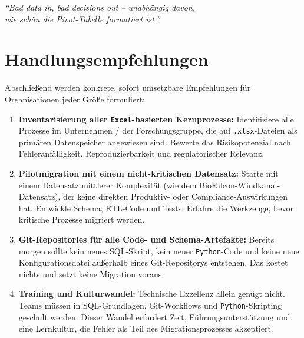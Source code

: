 \documentclass[12pt,a4paper]{report}
\theoremstyle{definition}
\theoremstyle{remark}
\newcommand{\excel}{\texttt{Excel}}
\newcommand{\py}{\texttt{Python}}
\newcommand{\code}[1]{\texttt{#1}}
\begin{document}
\bigskip
\begin{center}
  {\large\itshape
    ``Bad data in, bad decisions out -- unabhängig davon,\\
    wie schön die Pivot-Tabelle formatiert ist.''
  }
\end{center}

\section{Handlungsempfehlungen}

Abschließend werden konkrete, sofort umsetzbare Empfehlungen für
Organisationen jeder Größe formuliert:

\begin{enumerate}[leftmargin=1.5em, itemsep=5pt]
  \item \textbf{Inventarisierung aller \excel-basierten Kernprozesse:}
        Identifiziere alle Prozesse im Unternehmen / der Forschungsgruppe,
        die auf \code{.xlsx}-Dateien als primären Datenspeicher angewiesen
        sind. Bewerte das Risikopotenzial nach Fehleranfälligkeit,
        Reproduzierbarkeit und regulatorischer Relevanz.

  \item \textbf{Pilotmigration mit einem nicht-kritischen Datensatz:}
        Starte mit einem Datensatz mittlerer Komplexität (wie dem
        BioFalcon-Windkanal-Datensatz), der keine direkten Produktiv-
        oder Compliance-Auswirkungen hat.
        Entwickle Schema, ETL-Code und Tests.
        Erfahre die Werkzeuge, bevor kritische Prozesse migriert werden.

  \item \textbf{Git-Repositories für alle Code- und Schema-Artefakte:}
        Bereits morgen sollte kein neues SQL-Skript, kein neuer
        \py-Code und keine neue Konfigurationsdatei außerhalb eines
        Git-Repositorys entstehen.
        Das kostet nichts und setzt keine Migration voraus.

  \item \textbf{Training und Kulturwandel:}
        Technische Exzellenz allein genügt nicht.
        Teams müssen in SQL-Grundlagen, Git-Workflows und
        \py-Skripting geschult werden.
        Dieser Wandel erfordert Zeit, Führungsunterstützung und eine
        Lernkultur, die Fehler als Teil des Migrationsprozesses akzeptiert.


\end{enumerate}
\end{document}
